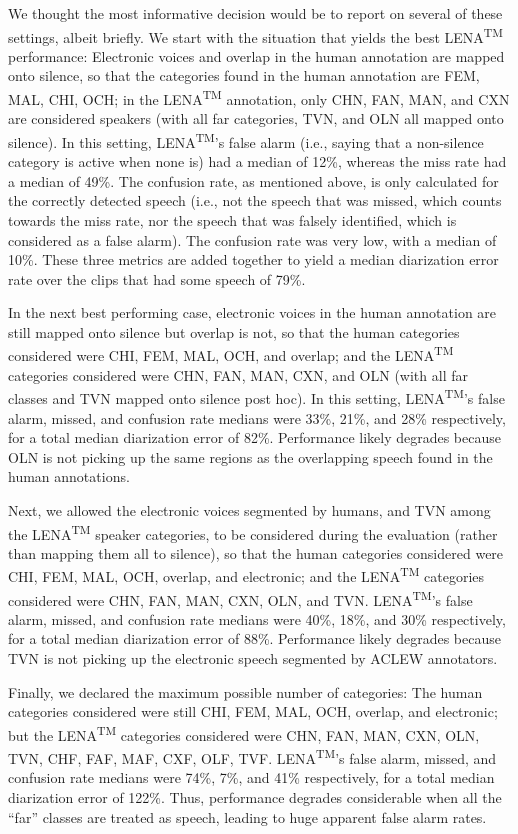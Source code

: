 \documentclass[english,floatsintext,man]{apa6}
\begin{document}
We thought the most informative decision would be to report on several
of these settings, albeit briefly. We start with the situation that
yields the best LENA\textsuperscript{TM} performance: Electronic voices
and overlap in the human annotation are mapped onto silence, so that the
categories found in the human annotation are FEM, MAL, CHI, OCH; in the
LENA\textsuperscript{TM} annotation, only CHN, FAN, MAN, and CXN are
considered speakers (with all far categories, TVN, and OLN all mapped
onto silence). In this setting, LENA\textsuperscript{TM}'s false alarm
(i.e., saying that a non-silence category is active when none is) had a
median of 12\%, whereas the miss rate had a median of 49\%. The
confusion rate, as mentioned above, is only calculated for the correctly
detected speech (i.e., not the speech that was missed, which counts
towards the miss rate, nor the speech that was falsely identified, which
is considered as a false alarm). The confusion rate was very low, with a
median of 10\%. These three metrics are added together to yield a median
diarization error rate over the clips that had some speech of 79\%.

In the next best performing case, electronic voices in the human
annotation are still mapped onto silence but overlap is not, so that the
human categories considered were CHI, FEM, MAL, OCH, and overlap; and
the LENA\textsuperscript{TM} categories considered were CHN, FAN, MAN,
CXN, and OLN (with all far classes and TVN mapped onto silence post
hoc). In this setting, LENA\textsuperscript{TM}'s false alarm, missed,
and confusion rate medians were 33\%, 21\%, and 28\% respectively, for a
total median diarization error of 82\%. Performance likely degrades
because OLN is not picking up the same regions as the overlapping speech
found in the human annotations.

Next, we allowed the electronic voices segmented by humans, and TVN
among the LENA\textsuperscript{TM} speaker categories, to be considered
during the evaluation (rather than mapping them all to silence), so that
the human categories considered were CHI, FEM, MAL, OCH, overlap, and
electronic; and the LENA\textsuperscript{TM} categories considered were
CHN, FAN, MAN, CXN, OLN, and TVN. LENA\textsuperscript{TM}'s false
alarm, missed, and confusion rate medians were 40\%, 18\%, and 30\%
respectively, for a total median diarization error of 88\%. Performance
likely degrades because TVN is not picking up the electronic speech
segmented by ACLEW annotators.

Finally, we declared the maximum possible number of categories: The
human categories considered were still CHI, FEM, MAL, OCH, overlap, and
electronic; but the LENA\textsuperscript{TM} categories considered were
CHN, FAN, MAN, CXN, OLN, TVN, CHF, FAF, MAF, CXF, OLF, TVF.
LENA\textsuperscript{TM}'s false alarm, missed, and confusion rate
medians were 74\%, 7\%, and 41\% respectively, for a total median
diarization error of 122\%. Thus, performance degrades considerable when
all the \enquote{far} classes are treated as speech, leading to huge
apparent false alarm rates.
\end{document}

